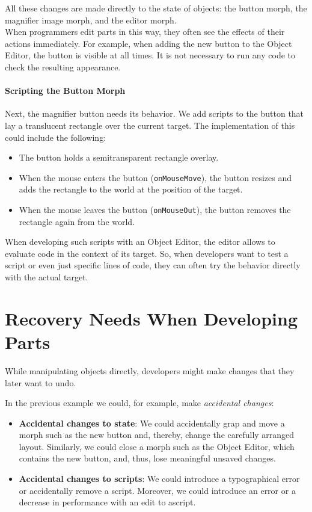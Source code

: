 All these changes are made directly to the state of objects: the button morph, the magnifier image morph, and the editor morph.\\
When programmers edit parts in this way, they often see the effects of their actions immediately.
For example, when adding the new button to the Object Editor, the button is visible at all times.
It is not necessary to run any code to check the resulting appearance.

\paragraph{Scripting the Button Morph}
Next, the magnifier button needs its behavior.
We add scripts to the button that lay a translucent rectangle over the current target.
The implementation of this could include the following: 
\begin{itemize}
    \item The button holds a semitransparent rectangle overlay.
    \item When the mouse enters the button (\lstinline{onMouseMove}), the button resizes and adds the rectangle to the world at the position of the target.
    \item When the mouse leaves the button (\lstinline{onMouseOut}), the button removes the rectangle again from the world.
\end{itemize}
 
When developing such scripts with an Object Editor, the editor allows to evaluate code in the context of its target.
So, when developers want to test a script or even just specific lines of code, they can often try the behavior directly with the actual target.


\section{Recovery Needs When Developing Parts}

While manipulating objects directly, developers might make changes that they later want to undo.

In the previous example we could, for example, make \emph{accidental changes}:

\begin{itemize}
    \item \textbf{Accidental changes to state}: We could accidentally grap and move a morph such as the new button and, thereby, change the carefully arranged layout. Similarly, we could close a morph such as the Object Editor, which contains the new button, and, thus, lose meaningful unsaved changes.
    \item \textbf{Accidental changes to scripts}: We could introduce a typographical error or accidentally remove a script. Moreover, we could introduce an error or a decrease in performance with an edit to ascript.
\end{itemize}


